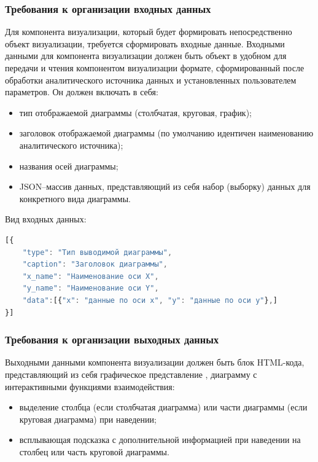 \documentclass[a4paper]{extarticle}
\begin{document}
\subsubsection{Требования к организации входных данных}
Для компонента визуализации, который будет формировать непосредственно объект визуализации, требуется сформировать входные данные. Входными данными для компонента визуализации должен быть объект в удобном для передачи и чтения компонентом визуализации формате, сформированный после обработки аналитического источника данных и установленных пользователем параметров. Он должен включать в себя:\par
\begin{itemize}
  \item тип отображаемой диаграммы (столбчатая, круговая, график);
  \item заголовок отображаемой диаграммы (по умолчанию идентичен наименованию аналитического источника);
  \item названия осей диаграммы;
  \item JSON–массив данных, представляющий из себя набор (выборку) данных для конкретного вида диаграммы.
\end{itemize}\par
Вид входных данных:\par
\lstset{inputencoding=utf8, extendedchars=\true, commentstyle=\itshape}
\begin{lstlisting}[language=JavaScript]
[{
	"type": "Тип выводимой диаграммы",
	"caption": "Заголовок диаграммы",
	"x_name": "Наименование оси X",
	"y_name": "Наименование оси Y",
	"data":[{"x": "данные по оси x", "y": "данные по оси y"},]
}]
\end{lstlisting}

\subsubsection{Требования к организации выходных данных}
Выходными данными компонента визуализации должен быть блок HTML-кода, представляющий из себя графическое представление , диаграмму с интерактивными функциями взаимодействия:
\begin{itemize}
  \item выделение столбца (если столбчатая диаграмма) или части диаграммы (если круговая диаграмма) при наведении;
  \item всплывающая подсказка с дополнительной информацией при наведении на столбец или часть круговой диаграммы.
\end{itemize}
\end{document}
